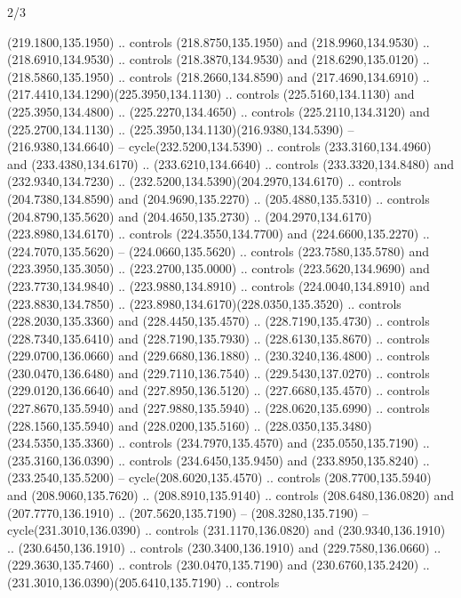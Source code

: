 \begin{flagdescription}{2/3}
\begin{scope}[xshift=0.5\flaglength,yshift=0.5\flagwidth,scale=\flagwidth/259.2]
\begin{scope}[y=0.8pt, x=0.8pt, yscale=-1,shift={(-243,-162)}]
      (219.1800,135.1950) .. controls (218.8750,135.1950) and (218.9960,134.9530) ..
      (218.6910,134.9530) .. controls (218.3870,134.9530) and (218.6290,135.0120) ..
      (218.5860,135.1950) .. controls (218.2660,134.8590) and (217.4690,134.6910) ..
      (217.4410,134.1290)(225.3950,134.1130) .. controls (225.5160,134.1130) and
      (225.3950,134.4800) .. (225.2270,134.4650) .. controls (225.2110,134.3120) and
      (225.2700,134.1130) .. (225.3950,134.1130)(216.9380,134.5390) --
      (216.9380,134.6640) -- cycle(232.5200,134.5390) .. controls
      (233.3160,134.4960) and (233.4380,134.6170) .. (233.6210,134.6640) .. controls
      (233.3320,134.8480) and (232.9340,134.7230) ..
      (232.5200,134.5390)(204.2970,134.6170) .. controls (204.7380,134.8590) and
      (204.9690,135.2270) .. (205.4880,135.5310) .. controls (204.8790,135.5620) and
      (204.4650,135.2730) .. (204.2970,134.6170)(223.8980,134.6170) .. controls
      (224.3550,134.7700) and (224.6600,135.2270) .. (224.7070,135.5620) --
      (224.0660,135.5620) .. controls (223.7580,135.5780) and (223.3950,135.3050) ..
      (223.2700,135.0000) .. controls (223.5620,134.9690) and (223.7730,134.9840) ..
      (223.9880,134.8910) .. controls (224.0040,134.8910) and (223.8830,134.7850) ..
      (223.8980,134.6170)(228.0350,135.3520) .. controls (228.2030,135.3360) and
      (228.4450,135.4570) .. (228.7190,135.4730) .. controls (228.7340,135.6410) and
      (228.7190,135.7930) .. (228.6130,135.8670) .. controls (229.0700,136.0660) and
      (229.6680,136.1880) .. (230.3240,136.4800) .. controls (230.0470,136.6480) and
      (229.7110,136.7540) .. (229.5430,137.0270) .. controls (229.0120,136.6640) and
      (227.8950,136.5120) .. (227.6680,135.4570) .. controls (227.8670,135.5940) and
      (227.9880,135.5940) .. (228.0620,135.6990) .. controls (228.1560,135.5940) and
      (228.0200,135.5160) .. (228.0350,135.3480)(234.5350,135.3360) .. controls
      (234.7970,135.4570) and (235.0550,135.7190) .. (235.3160,136.0390) .. controls
      (234.6450,135.9450) and (233.8950,135.8240) .. (233.2540,135.5200) --
      cycle(208.6020,135.4570) .. controls (208.7700,135.5940) and
      (208.9060,135.7620) .. (208.8910,135.9140) .. controls (208.6480,136.0820) and
      (207.7770,136.1910) .. (207.5620,135.7190) -- (208.3280,135.7190) --
      cycle(231.3010,136.0390) .. controls (231.1170,136.0820) and
      (230.9340,136.1910) .. (230.6450,136.1910) .. controls (230.3400,136.1910) and
      (229.7580,136.0660) .. (229.3630,135.7460) .. controls (230.0470,135.7190) and
      (230.6760,135.2420) .. (231.3010,136.0390)(205.6410,135.7190) .. controls

\end{scope}
\end{scope}
\end{flagdescription}
